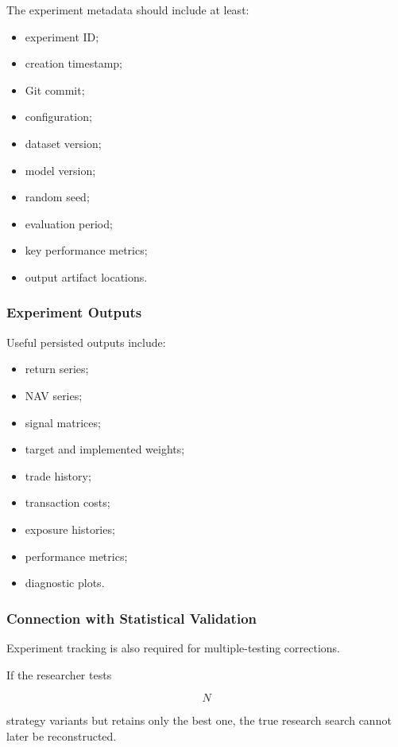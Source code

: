 \documentclass[11pt,a4paper]{article}
\begin{document}
The experiment metadata should include at least:

\begin{itemize}
    \item experiment ID;
    \item creation timestamp;
    \item Git commit;
    \item configuration;
    \item dataset version;
    \item model version;
    \item random seed;
    \item evaluation period;
    \item key performance metrics;
    \item output artifact locations.
\end{itemize}


\subsubsection{Experiment Outputs}

Useful persisted outputs include:

\begin{itemize}
    \item return series;
    \item NAV series;
    \item signal matrices;
    \item target and implemented weights;
    \item trade history;
    \item transaction costs;
    \item exposure histories;
    \item performance metrics;
    \item diagnostic plots.
\end{itemize}


\subsubsection{Connection with Statistical Validation}

Experiment tracking is also required for multiple-testing corrections.

If the researcher tests

\begin{equation}
N
\end{equation}

strategy variants but retains only the best one, the true research search cannot
later be reconstructed.
\end{document}
